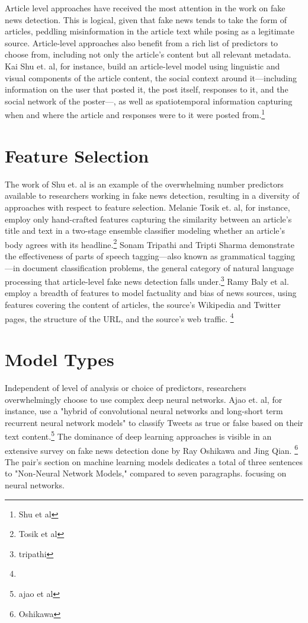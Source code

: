 \documentclass[../thesis.tex]{subfiles}
\begin{document}
Article level approaches have received the most attention in the work on fake news detection. This is logical, given that fake news tends to take the form of articles, peddling misinformation in the article text while posing as a legitimate source. Article-level approaches also benefit from a rich list of predictors to choose from, including not only the article's content but all relevant metadata. Kai Shu et. al, for instance, build an article-level model using linguistic and visual components of the article content, the social context around it---including information on the user that posted it, the post itself, responses to it, and the social network of the poster---, as well as spatiotemporal information capturing when and where the article and responses were to it were posted from.\footnote{Shu et al}

\section{Feature Selection}

The work of Shu et. al is an example of the overwhelming number predictors available to researchers working in fake news detection, resulting in a diversity of approaches with respect to feature selection. Melanie Tosik et. al, for instance, employ only hand-crafted features capturing the similarity between an article's title and text in a two-stage ensemble classifier modeling whether an article's body agrees with its headline.\footnote{Tosik et al} Sonam Tripathi and Tripti Sharma demonstrate the effectiveness of parts of speech tagging---also known as grammatical tagging---in document classification problems, the general category of natural language processing that article-level fake news detection falls under.\footnote{tripathi} Ramy Baly et al. employ a breadth of features to model factuality and bias of news sources, using features covering the content of articles, the source's Wikipedia and Twitter pages, the structure of the URL, and the source's web traffic. \footnote{}

\section{Model Types}

Independent of level of analysis or choice of predictors, researchers overwhelmingly choose to use complex deep neural networks. Ajao et. al, for instance, use a "hybrid of convolutional neural networks and long-short term recurrent neural network models" to classify Tweets as true or false based on their text content.\footnote{ajao et al} The dominance of deep learning approaches is visible in an extensive survey on fake news detection done by Ray Oshikawa and Jing Qian. \footnote{Oshikawa} The pair's section on machine learning models dedicates a total of three sentences to "Non-Neural Network Models," compared to seven paragraphs. focusing on neural networks.
\end{document}
